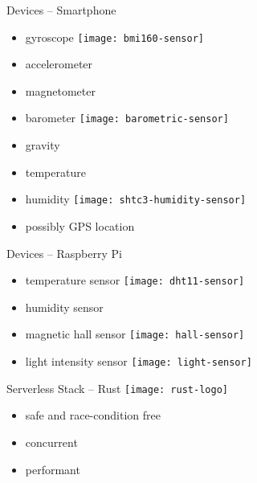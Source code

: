 \documentclass[aspectratio=1610]{beamer}
\begin{document}
  \begin{frame}{Devices -- Smartphone}
    \begin{itemize}
      \item gyroscope
            \hspace*{2em}
            \texttt{[image: bmi160-sensor]}
      \item accelerometer
      \item magnetometer
      \item barometer
            \hspace*{2em}
            \texttt{[image: barometric-sensor]}
      \item gravity
      \item temperature
      \item humidity
            \hspace*{2em}
            \texttt{[image: shtc3-humidity-sensor]}
      \item possibly GPS location
    \end{itemize}
  \end{frame}

  \begin{frame}{Devices -- Raspberry Pi}
    \begin{itemize}
      \item temperature sensor
            \hspace*{2em}
            \texttt{[image: dht11-sensor]}
      \item humidity sensor
      \item magnetic hall sensor
            \hspace*{2em}
            \texttt{[image: hall-sensor]}
      \item light intensity sensor
            \hspace*{2em}
            \texttt{[image: light-sensor]}
    \end{itemize}
  \end{frame}

  \begin{frame}{Serverless Stack -- Rust}
    \texttt{[image: rust-logo]}

    \vspace*{1.5em}

    \begin{itemize}
      \item safe and race-condition free
      \item concurrent
      \item performant
    \end{itemize}
  \end{frame}
\end{document}
